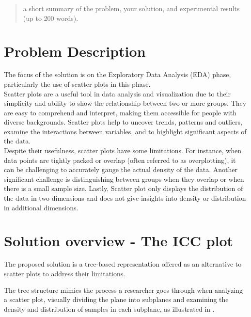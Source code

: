 \documentclass[12pt]{article}
\begin{document}
\maketitle

\begin{abstract}
a short summary of the problem, your solution, and experimental results (up to 200 words).
\end{abstract}

\section{Problem Description}\label{Problem Description}
The focus of the solution is on the Exploratory Data Analysis (EDA) phase, particularly the use of scatter plots in this phase. \\
Scatter plots are a useful tool in data analysis and visualization due to their simplicity and ability to show the relationship between two or more groups. They are easy to comprehend and interpret, making them accessible for people with diverse backgrounds. Scatter plots help to uncover trends, patterns and outliers, examine the interactions between variables, and to highlight significant aspects of the data. \\
Despite their usefulness, scatter plots have some limitations. For instance, when data points are tightly packed or overlap (often referred to as overplotting), it can be challenging to accurately gauge the actual density of the data. Another significant challenge is distinguishing between groups when they overlap or when there is a small sample size. Lastly, Scatter plot only displays the distribution of the data in two dimensions and does not give insights into density or distribution in additional dimensions.

\section{Solution overview - The ICC plot}\label{Solution overview}
The proposed solution is a tree-based representation offered as an alternative to scatter plots to address their limitations.

The tree structure mimics the process a researcher goes through when analyzing a scatter plot, visually dividing the plane into subplanes and examining the density and distribution of samples in each subplane, as illustrated in .
\end{document}
